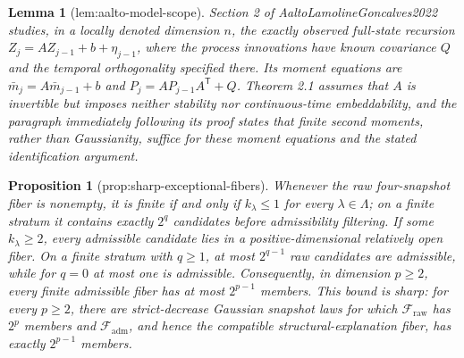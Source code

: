 \documentclass{article}
\newtheorem{lemma}{Lemma}
\newtheorem{proposition}{Proposition}
\begin{document}
\begin{lemma}[lem:aalto-model-scope]\label{lem:aalto-model-scope}
Section 2 of AaltoLamolineGoncalves2022 studies, in a locally denoted dimension \(n\), the exactly observed full-state recursion \(Z_j=A Z_{j-1}+b+\eta_{j-1}\), where the process innovations have known covariance \(Q\) and the temporal orthogonality specified there.  Its moment equations are \(\bar m_j=A\bar m_{j-1}+b\) and \(P_j=AP_{j-1}A^{\mathsf T}+Q\).  Theorem 2.1 assumes that \(A\) is invertible but imposes neither stability nor continuous-time embeddability, and the paragraph immediately following its proof states that finite second moments, rather than Gaussianity, suffice for these moment equations and the stated identification argument.
\end{lemma}

\begin{proposition}[prop:sharp-exceptional-fibers]\label{prop:sharp-exceptional-fibers}
Whenever the raw four-snapshot fiber is nonempty, it is finite if and only if \(k_\lambda\leq 1\) for every \(\lambda\in\Lambda\); on a finite stratum it contains exactly \(2^q\) candidates before admissibility filtering.  If some \(k_\lambda\geq 2\), every admissible candidate lies in a positive-dimensional relatively open fiber.  On a finite stratum with \(q\geq1\), at most \(2^{q-1}\) raw candidates are admissible, while for \(q=0\) at most one is admissible.  Consequently, in dimension \(p\geq2\), every finite admissible fiber has at most \(2^{p-1}\) members.  This bound is sharp: for every \(p\geq2\), there are strict-decrease Gaussian snapshot laws for which \(\mathcal F_{\mathrm{raw}}\) has \(2^p\) members and \(\mathcal F_{\mathrm{adm}}\), and hence the compatible structural-explanation fiber, has exactly \(2^{p-1}\) members.
\end{proposition}
\end{document}
